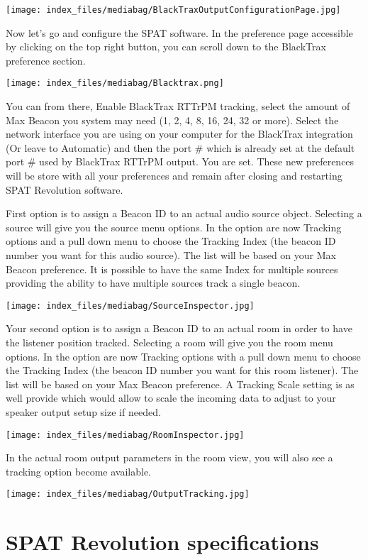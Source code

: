 \documentclass[
  letterpaper,
  DIV=11,
  numbers=noendperiod]{scrreport}
\begin{document}
\texttt{[image: index\_files/mediabag/BlackTraxOutputConfigurationPage.jpg]}

Now let's go and configure the SPAT software. In the preference page
accessible by clicking on the top right button, you can scroll down to
the BlackTrax preference section.

\texttt{[image: index\_files/mediabag/Blacktrax.png]}

You can from there, Enable BlackTrax RTTrPM tracking, select the amount
of Max Beacon you system may need (1, 2, 4, 8, 16, 24, 32 or more).
Select the network interface you are using on your computer for the
BlackTrax integration (Or leave to Automatic) and then the port \# which
is already set at the default port \# used by BlackTrax RTTrPM output.
You are set. These new preferences will be store with all your
preferences and remain after closing and restarting SPAT Revolution
software.

First option is to assign a Beacon ID to an actual audio source object.
Selecting a source will give you the source menu options. In the option
are now Tracking options and a pull down menu to choose the Tracking
Index (the beacon ID number you want for this audio source). The list
will be based on your Max Beacon preference. It is possible to have the
same Index for multiple sources providing the ability to have multiple
sources track a single beacon.

\texttt{[image: index\_files/mediabag/SourceInspector.jpg]}

Your second option is to assign a Beacon ID to an actual room in order
to have the listener position tracked. Selecting a room will give you
the room menu options. In the option are now Tracking options with a
pull down menu to choose the Tracking Index (the beacon ID number you
want for this room listener). The list will be based on your Max Beacon
preference. A Tracking Scale setting is as well provide which would
allow to scale the incoming data to adjust to your speaker output setup
size if needed.

\texttt{[image: index\_files/mediabag/RoomInspector.jpg]}

In the actual room output parameters in the room view, you will also see
a tracking option become available.

\texttt{[image: index\_files/mediabag/OutputTracking.jpg]}


\hypertarget{spat-revolution-specifications}{%
\chapter{SPAT Revolution
specifications}\label{spat-revolution-specifications}}
\end{document}
